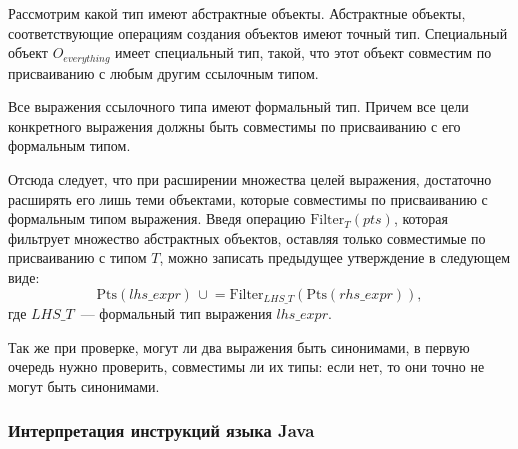\documentclass[14pt,titlepage]{extarticle}
\newcommand{\Pts}[1]{\textrm{Pts}(#1)}
\newcommand{\Filter}[2]{\textrm{Filter}_{#1}(#2)}
\newcommand{\cupe}{\,\cup\!\!=}
\begin{document}
      Рассмотрим какой тип имеют абстрактные объекты. Абстрактные объекты,
      соответствующие операциям создания объектов имеют точный тип.
      Специальный объект $O_{everything}$ имеет специальный тип, такой, что
      этот объект совместим по присваиванию с любым другим ссылочным типом.

      Все выражения ссылочного типа имеют формальный тип. Причем все цели
      конкретного выражения должны быть совместимы по присваиванию с его
      формальным типом.

      Отсюда следует, что при расширении множества целей выражения, достаточно
      расширять его лишь теми объектами, которые совместимы по присваиванию с
      формальным типом выражения.
      Введя операцию $\Filter{T}{pts}$, которая фильтрует множество
      абстрактных объектов, оставляя только совместимые по присваиванию с типом
      $T$, можно записать предыдущее утверждение в следующем виде:
      \[\Pts{lhs\_expr} \cupe \Filter{LHS\_T}{\Pts{rhs\_expr}},\]
      где $LHS\_T$~--- формальный тип выражения $lhs\_expr$.

      Так же при проверке, могут ли два выражения быть синонимами, в первую
      очередь нужно проверить, совместимы ли их типы: если нет, то они точно не
      могут быть синонимами.

      \subsubsection{Интерпретация инструкций языка Java}
\end{document}
